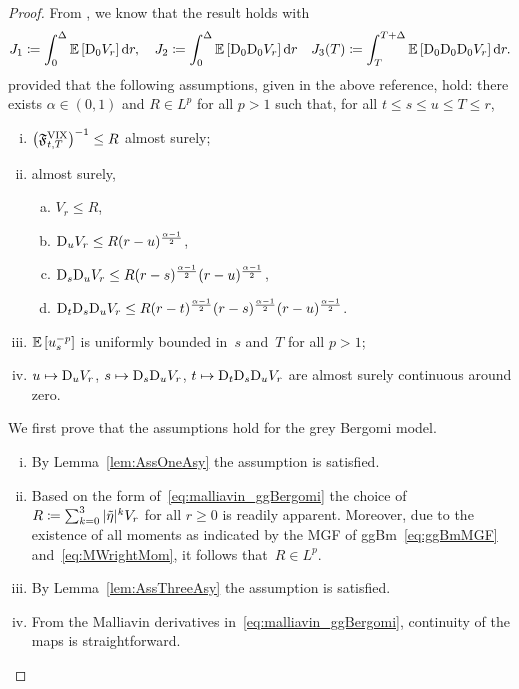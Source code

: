 \begin{proof}
From \cite[Proposition~4.1]{Jacquier2021RoughOptions},
we know that the result holds with
$$
J_1\coloneqq\int_0^{\Delta} \mathbb{E}\left[\mathrm{D}_0 V_r\right] \mathrm{d} r, \quad J_2\coloneqq\int_0^{\Delta} \mathbb{E}\left[\mathrm{D}_0 \mathrm{D}_0 V_r\right] \mathrm{d} r \quad J_3(T)\coloneqq\int_T^{T+\Delta} \mathbb{E}\left[\mathrm{D}_0 \mathrm{D}_0 \mathrm{D}_0 V_r\right] \mathrm{d} r.
$$
provided that the following assumptions, given in the above reference, hold:
there exists $\alpha \in \left(0, 1\right)$ and $R \in L^p$ for all $p>1$ such that,
for all $t \leq s \leq u \leq T \leq r$,
     \begin{enumerate}[(i)]
         \item $\left(\mathfrak{F}^{\mathrm{VIX}}_{t,T}\right)^{-1} \leq R$ almost surely;
         \item almost surely,
         \begin{enumerate}[a)]
             \item $V_r \leq R$, 
             \item $\mathrm{D}_u V_r \leq R (r-u)^{\frac{\alpha-1}{2}}$,
             \item $\mathrm{D}_s \mathrm{D}_u V_r \leq R(r-s)^{\frac{\alpha-1}{2}}(r-u)^{\frac{\alpha-1}{2}}$,
             \item $\mathrm{D}_t \mathrm{D}_s \mathrm{D}_u V_r \leq R(r-t)^{\frac{\alpha-1}{2}}(r-s)^{\frac{\alpha-1}{2}}(r-u)^{\frac{\alpha-1}{2}}$.
         \end{enumerate}
         \item $\mathbb{E}\left[u_s^{-p}\right]$ is uniformly bounded in~$s$ and~$T$ for all $p>1$;
         \item $u \mapsto \mathrm{D}_u V_r$, $s \mapsto \mathrm{D}_s \mathrm{D}_u V_r$, $t \mapsto \mathrm{D}_t \mathrm{D}_s \mathrm{D}_u V_r$ are almost surely continuous around zero.
     \end{enumerate}
We first prove that the assumptions hold for the grey Bergomi model.
    \begin{enumerate}[(i)]
        \item By Lemma~\ref{lem:AssOneAsy} the assumption is satisfied.
        \item Based on the form of~\eqref{eq:malliavin_ggBergomi} the choice of~$R\coloneqq\sum_{k=0}^3|\tilde\eta|^k V_r$ for all $r\geq 0$ is readily apparent. Moreover, due to the existence of all moments as indicated by the MGF of ggBm~\ref{eq:ggBmMGF} and~\eqref{eq:MWrightMom}, it follows that~$R\in L^p$.
        \item By Lemma~\ref{lem:AssThreeAsy} the assumption is satisfied.
        \item From the Malliavin derivatives in~\eqref{eq:malliavin_ggBergomi}, continuity of the maps is straightforward.
    \end{enumerate}


\end{proof}

